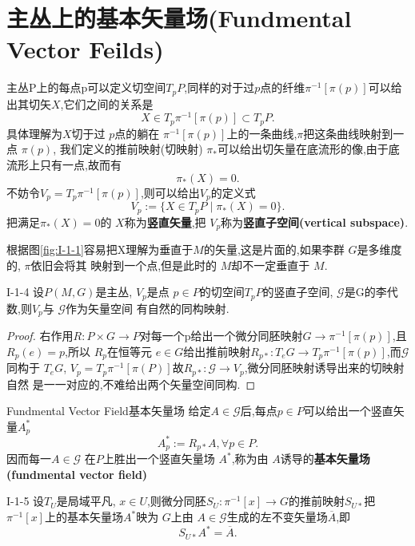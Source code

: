 \documentclass[../main.tex]{subfiles}
\begin{document}
 \section{主丛上的基本矢量场(Fundmental Vector Feilds)}
 主丛P上的每点p可以定义切空间$T_pP$,同样的对于过$p$点的纤维$\pi^{-1}[\pi(p)]$可以给出其切矢$X$,它们之间的关系是
 \[
   X \in T_p\pi^{-1}[\pi(p)] \subset T_pP
 .\] 
 具体理解为$X$切于过 $p$点的躺在 $\pi^{-1}[\pi(p)]$上的一条曲线,$\pi$把这条曲线映射到一点 $\pi(p)$,
 我们定义的推前映射(切映射) $\pi_*$可以给出切矢量在底流形的像,由于底流形上只有一点,故而有 \[
   \pi_*(X) = 0
 .\] 
 不妨令$V_p = T_p\pi^{-1}[\pi(p)]$,则可以给出$V_p$的定义式 \[
   V_p := \{X \in T_pP  \mid  \pi_*(X) = 0\}
 .\] 
 把满足$\pi_*(X) = 0$的 $X$称为\textbf{竖直矢量},把 $V_p$称为\textbf{竖直子空间(vertical subspace)}.
 \begin{note}
   根据图\ref{fig:I-1-1}容易把X理解为垂直于$M$的矢量,这是片面的,如果李群 $G$是多维度的, $\pi$依旧会将其
   映射到一个点,但是此时的 $M$却不一定垂直于 $M$.
 \end{note}
 \begin{theorem}
   {}{I-1-4}
   设$P(M,G)$是主丛, $V_p$是点 $p \in  P$的切空间$T_pP$的竖直子空间, $\mathscr{G}$是G的李代数,则$V_p$与 $\mathscr{G}$作为矢量空间
   有自然的同构映射.
 \end{theorem}
 \begin{proof}
   右作用$R:P \times G \to P$对每一个p给出一个微分同胚映射$G \to \pi^{-1}[\pi(p)]$,且$R_p(e) = p$,所以
   $R_p$在恒等元 $e \in G$给出推前映射$R_{p*} :T_eG \to T_p \pi^{-1}[\pi(p)]$,而$\mathscr{G}$同构于
   $T_eG$, $V_p = T_p\pi^{-1}[\pi(P)]$故$R_{p*} : \mathscr{G}\to V_p$,微分同胚映射诱导出来的切映射自然
   是一一对应的,不难给出两个矢量空间同构.
 \end{proof}
 \begin{definition}
   {Fundmental Vector Field}{基本矢量场}
   给定$A\in \mathscr{G}$后,每点$p \in P$可以给出一个竖直矢量$A^*_p$ \[
     A^*_p := R_{p*} A , \forall p \in P
   .\] 
   因而每一$A\in \mathscr{G}$ 在$P$上胜出一个竖直矢量场 $A^*$,称为由 $A$诱导的\textbf{基本矢量场(fundmental vector field)}
 \end{definition}
 \begin{theorem}
   {}{I-1-5}
   设$T_U$是局域平凡, $x\in U$,则微分同胚$S_U:\pi^{-1}[x] \to G$的推前映射$S_{U*}$把 $\pi^{-1}[x]$上的基本矢量场$A^*$映为 $G$上由 $A \in \mathscr{G}$生成的左不变矢量场$\overline{A}$,即
   \[
     S_{U*}A^* = \overline{A}
   .\] 
 \end{theorem}
\end{document}

